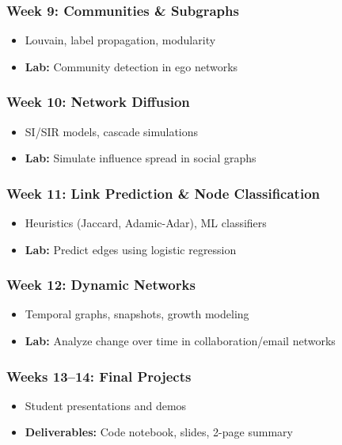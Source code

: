 \documentclass[12pt]{article}
\begin{document}
\subsubsection*{Week 9: Communities \& Subgraphs}
\begin{itemize}
  \item Louvain, label propagation, modularity
  \item \textbf{Lab:} Community detection in ego networks
\end{itemize}

\subsubsection*{Week 10: Network Diffusion}
\begin{itemize}
  \item SI/SIR models, cascade simulations
  \item \textbf{Lab:} Simulate influence spread in social graphs
\end{itemize}

\subsubsection*{Week 11: Link Prediction \& Node Classification}
\begin{itemize}
  \item Heuristics (Jaccard, Adamic-Adar), ML classifiers
  \item \textbf{Lab:} Predict edges using logistic regression
\end{itemize}

\subsubsection*{Week 12: Dynamic Networks}
\begin{itemize}
  \item Temporal graphs, snapshots, growth modeling
  \item \textbf{Lab:} Analyze change over time in collaboration/email networks
\end{itemize}

\subsubsection*{Weeks 13--14: Final Projects}
\begin{itemize}
  \item Student presentations and demos
  \item \textbf{Deliverables:} Code notebook, slides, 2-page summary
\end{itemize}
\end{document}
